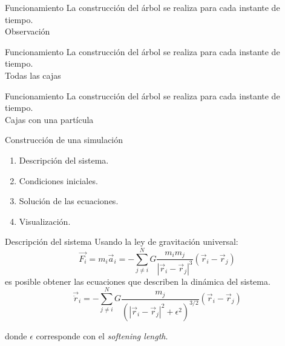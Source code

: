 \documentclass{beamer}
\begin{document}
\begin{frame}{Funcionamiento}
	La construcci\'on del \'arbol se realiza para cada instante de tiempo.
	\centering
	\\
	Observaci\'on
\end{frame}
\begin{frame}{Funcionamiento}
	La construcci\'on del \'arbol se realiza para cada instante de tiempo.
	\centering
	\\
	Todas las cajas
\end{frame}
\begin{frame}{Funcionamiento}
	La construcci\'on del \'arbol se realiza para cada instante de tiempo.
	\centering
	\\
	Cajas con una part\'icula
\end{frame}
\begin{frame}{Construcci\'on de una simulaci\'on}
	\begin{enumerate}
		\item Descripci\'on del sistema. \pause
		\item Condiciones iniciales. \pause
		\item Soluci\'on de las ecuaciones. \pause
		\item Visualizaci\'on.
	\end{enumerate}
\end{frame}
\begin{frame}{Descripci\'on del sistema}
	Usando la ley de gravitaci\'on universal:
	\begin{equation}
		\vec{F_i} = m_i\vec{a}_i = - \sum\limits_{j\neq i}^N G\dfrac{m_im_j}{|\vec{r}_i - \vec{r}_j|^3}\left(\vec{r}_i - \vec{r}_j\right)
	\end{equation}\pause
	es posible obtener las ecuaciones que describen la din\'amica del sistema.\pause
	\begin{equation}
		\vec{\ddot{r}}_i = - \sum\limits_{j\neq i}^N G\dfrac{m_j}{\left(|\vec{r}_i - \vec{r}_j|^2 + \epsilon^2\right)^{3/2}}\left(\vec{r}_i - \vec{r}_j\right)
	\end{equation}
	
	donde $\epsilon$ corresponde con el \textit{softening length}.
\end{frame}
\end{document}
